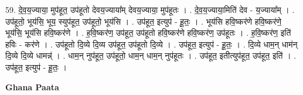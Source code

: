 \documentclass[17pt]{extarticle}
\begin{document}
59. दे॒व॒य॒ज्याया॒ मुप॑हूत॒ उप॑हूतो देवय॒ज्याया᳚म् देवय॒ज्याया॒ मुप॑हूतः । . दे॒व॒य॒ज्याया॒मिति॑ देव - य॒ज्याया᳚म् । . उप॑हूतो॒ भूय॑सि॒ भूय॒ स्युप॑हूत॒ उप॑हूतो॒ भूय॑सि । . उप॑हूत॒ इत्युप॑ - हू॒तः॒ । . भूय॑सि हवि॒ष्कर॑णे हवि॒ष्कर॑णे॒ भूय॑सि॒ भूय॑सि हवि॒ष्कर॑णे । . ह॒वि॒ष्कर॑ण॒ उप॑हूत॒ उप॑हूतो हवि॒ष्कर॑णे हवि॒ष्कर॑ण॒ उप॑हूतः । . ह॒वि॒ष्कर॑ण॒ इति॑ हविः - कर॑णे । . उप॑हूतो दि॒व्ये दि॒व्य उप॑हूत॒ उप॑हूतो दि॒व्ये । . उप॑हूत॒ इत्युप॑ - हू॒तः॒ । . दि॒व्ये धाम॒न् धाम॑न् दि॒व्ये दि॒व्ये धामन्न्॑ । . धाम॒न् नुप॑हूत॒ उप॑हूतो॒ धाम॒न् धाम॒न् नुप॑हूतः । . उप॑हूत॒ इतीत्युप॑हूत॒ उप॑हूत॒ इति॑ । . उप॑हूत॒ इत्युप॑ - हू॒तः॒ । \newline

\textbf{Ghana Paata } \newline
\end{document}
